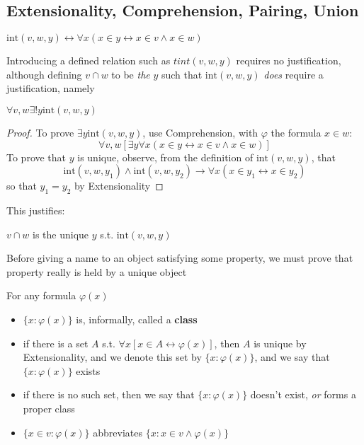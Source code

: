 \documentclass[11pt]{article}
\def \tint {\text{int}}
\begin{document}
\subsection{Extensionality, Comprehension, Pairing, Union}
\label{sec:org5ca4434}
\begin{definition}[]
\(\text{int}(v,w,y)\leftrightarrow\forall x(x\in y\leftrightarrow x\in v\wedge x\in w)\)
\end{definition}

Introducing a defined relation such as \(tint(v,w,y)\) requires no justification, although
defining \(v\cap w\) to be \emph{the} \(y\) such that \(\tint(v,w,y)\) \emph{does} require a justification, namely
\begin{lemma}[]
\(\forall v,w\exists!y\tint(v,w,y)\)
\end{lemma}

\begin{proof}
To prove \(\exists y\tint(v,w,y)\), use Comprehension, with \(\varphi\) the formula \(x\in w\):
\begin{equation*}
\forall v,w[\exists y\forall x(x\in y\leftrightarrow x\in v\wedge x\in w)]
\end{equation*}
To prove that \(y\) is unique, observe, from the definition of \(\tint(v,w,y)\), that
\begin{equation*}
\tint(v,w,y_1)\wedge\tint(v,w,y_2)\to\forall x(x\in y_1\leftrightarrow x\in y_2)
\end{equation*}
so that \(y_1=y_2\) by Extensionality
\end{proof}

This justifies:
\begin{definition}[]
\(v\cap w\) is the unique \(y\) s.t. \(\tint(v,w,y)\)
\end{definition}

Before giving a name to an object satisfying some property, we must prove that property really is
held by a unique object

\begin{definition}[]
For any formula \(\varphi(x)\)
\begin{itemize}
\item \(\{x:\varphi(x)\}\) is, informally, called a \textbf{class}
\item if there is a set \(A\) s.t. \(\forall x[x\in A\leftrightarrow\varphi(x)]\), then \(A\) is unique by Extensionality, and we
denote this set by \(\{x:\varphi(x)\}\), and we say that \(\{x:\varphi(x)\}\) exists
\item if there is no such set, then we say that \(\{x:\varphi(x)\}\) doesn't exist, \emph{or} forms a proper class
\item \(\{x\in v:\varphi(x)\}\) abbreviates \(\{x:x\in v\wedge\varphi(x)\}\)
\end{itemize}
\end{definition}
\end{document}
